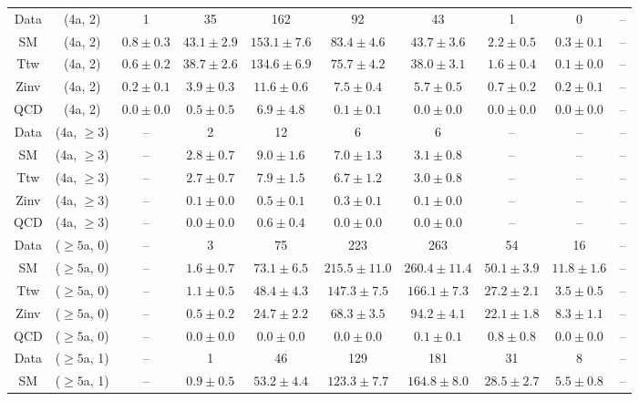 \begin{table}[h!]
{\begin{tabular}{cccccccccc}
	Data & (4a, 2) & 1 & 35 & 162 & 92 & 43 & 1 & 0 & -- \\[0.5ex] 
	SM & (4a, 2) & $0.8\pm 0.3$ & $43.1\pm 2.9$ & $153.1\pm 7.6$ & $83.4\pm 4.6$ & $43.7\pm 3.6$ & $2.2\pm 0.5$ & $0.3\pm 0.1$ & -- \\[0.5ex] 
	Ttw & (4a, 2) & $0.6\pm 0.2$ & $38.7\pm 2.6$ & $134.6\pm 6.9$ & $75.7\pm 4.2$ & $38.0\pm 3.1$ & $1.6\pm 0.4$ & $0.1\pm 0.0$ & -- \\[0.5ex] 
	Zinv & (4a, 2) & $0.2\pm 0.1$ & $3.9\pm 0.3$ & $11.6\pm 0.6$ & $7.5\pm 0.4$ & $5.7\pm 0.5$ & $0.7\pm 0.2$ & $0.2\pm 0.1$ & -- \\[0.5ex] 
	QCD & (4a, 2) & $0.0\pm 0.0$ & $0.5\pm 0.5$ & $6.9\pm 4.8$ & $0.1\pm 0.1$ & $0.0\pm 0.0$ & $0.0\pm 0.0$ & $0.0\pm 0.0$ & -- \\[0.5ex] 
	Data & (4a, $\ge3$) & -- & 2 & 12 & 6 & 6 & -- & -- & -- \\[0.5ex] 
	SM & (4a, $\ge3$) & -- & $2.8\pm 0.7$ & $9.0\pm 1.6$ & $7.0\pm 1.3$ & $3.1\pm 0.8$ & -- & -- & -- \\[0.5ex] 
	Ttw & (4a, $\ge3$) & -- & $2.7\pm 0.7$ & $7.9\pm 1.5$ & $6.7\pm 1.2$ & $3.0\pm 0.8$ & -- & -- & -- \\[0.5ex] 
	Zinv & (4a, $\ge3$) & -- & $0.1\pm 0.0$ & $0.5\pm 0.1$ & $0.3\pm 0.1$ & $0.1\pm 0.0$ & -- & -- & -- \\[0.5ex] 
	QCD & (4a, $\ge3$) & -- & $0.0\pm 0.0$ & $0.6\pm 0.4$ & $0.0\pm 0.0$ & $0.0\pm 0.0$ & -- & -- & -- \\[0.5ex] 
	Data & ($\ge5$a, 0) & -- & 3 & 75 & 223 & 263 & 54 & 16 & -- \\[0.5ex] 
	SM & ($\ge5$a, 0) & -- & $1.6\pm 0.7$ & $73.1\pm 6.5$ & $215.5\pm 11.0$ & $260.4\pm 11.4$ & $50.1\pm 3.9$ & $11.8\pm 1.6$ & -- \\[0.5ex] 
	Ttw & ($\ge5$a, 0) & -- & $1.1\pm 0.5$ & $48.4\pm 4.3$ & $147.3\pm 7.5$ & $166.1\pm 7.3$ & $27.2\pm 2.1$ & $3.5\pm 0.5$ & -- \\[0.5ex] 
	Zinv & ($\ge5$a, 0) & -- & $0.5\pm 0.2$ & $24.7\pm 2.2$ & $68.3\pm 3.5$ & $94.2\pm 4.1$ & $22.1\pm 1.8$ & $8.3\pm 1.1$ & -- \\[0.5ex] 
	QCD & ($\ge5$a, 0) & -- & $0.0\pm 0.0$ & $0.0\pm 0.0$ & $0.0\pm 0.0$ & $0.1\pm 0.1$ & $0.8\pm 0.8$ & $0.0\pm 0.0$ & -- \\[0.5ex] 
	Data & ($\ge5$a, 1) & -- & 1 & 46 & 129 & 181 & 31 & 8 & -- \\[0.5ex] 
	SM & ($\ge5$a, 1) & -- & $0.9\pm 0.5$ & $53.2\pm 4.4$ & $123.3\pm 7.7$ & $164.8\pm 8.0$ & $28.5\pm 2.7$ & $5.5\pm 0.8$ & -- \\[0.5ex] 

\end{tabular}}
\end{table}
